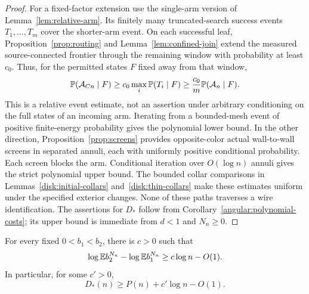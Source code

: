 \begin{proof}
For a fixed-factor extension use the single-arm version of
Lemma~\ref{lem:relative-arm}.  Its finitely many truncated-search
success events $T_1,\ldots,T_m$ cover the shorter-arm event.  On
each successful leaf, Proposition~\ref{prop:routing} and
Lemma~\ref{lem:confined-join} extend the measured source-connected
frontier through the remaining window with probability at least
$c_0$.  Thus, for the permitted states $F$ fixed away from that
window,
\[
 \mathbb P(\mathcal A_{Cn}\mid F)
 \ge c_0\max_i\mathbb P(T_i\mid F)
 \ge \frac{c_0}{m}\mathbb P(\mathcal A_n\mid F).
\]
This is a relative event estimate, not an assertion under arbitrary
conditioning on the full states of an incoming arm.  Iterating from a
bounded-mesh event of positive finite-energy probability
gives the polynomial lower bound.  In the other direction,
Proposition~\ref{prop:screens} provides opposite-color
actual wall-to-wall screens in separated annuli, each with
uniformly positive conditional probability.  Each screen
blocks the arm.  Conditional iteration over \(O(\log n)\)
annuli gives the strict polynomial upper bound.
The bounded collar comparisons in Lemmas~\ref{disk:initial-collars}
and~\ref{disk:thin-collars} make these estimates uniform under
the specified exterior changes.  None of
these paths traverses a wire identification.
The assertions for \(D_*\) follow from
Corollary~\ref{angular:polynomial-costs}; its upper bound
is immediate from \(d<1\) and \(N_n\ge0\).
\end{proof}

\begin{lemma}\label{lem:strict-flip}
For every fixed \(0<b_1<b_2\), there is \(c>0\) such that
\begin{equation}\label{angular:strict-weight-gap}
 \log\mathbb E b_2^{N_n}-\log\mathbb E b_1^{N_n}
       \ge c\log n-O(1).
\end{equation}
In particular, for some \(c'>0\),
\begin{equation}\label{angular:strict-flat-gap}
 D_*(n)\ge P(n)+c'\log n-O(1).
\end{equation}
\end{lemma}

